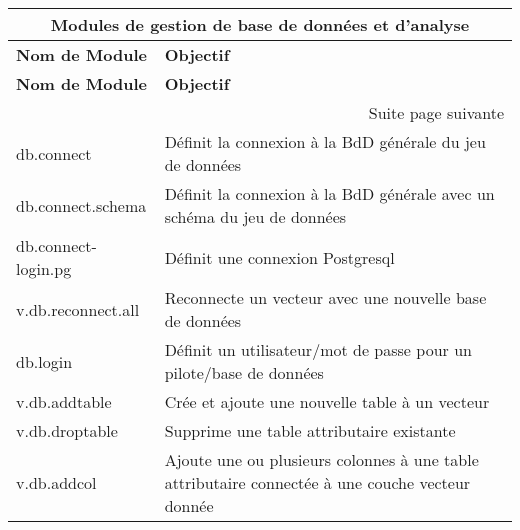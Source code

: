 \begin{center}
{\setlength{\extrarowheight}{10pt}
\small
\begin{longtable}{|p{4cm}|p{10cm}|}
\hline \multicolumn{2}{|c|}{\textbf{Modules de gestion de base de données et d'analyse}}\\
\hline \textbf{Nom de Module}&\textbf{Objectif}\\
\endfirsthead
\hline \textbf{Nom de Module}&\textbf{Objectif}\\
\endhead
\hline \multicolumn{2}{|r|}{{Suite page suivante}} \\ \hline
\endfoot
\endlastfoot
  \hline db.connect & Définit la connexion à la BdD générale du jeu de données \\
  \hline db.connect.schema & Définit la connexion à la BdD générale avec un schéma du jeu de données\\
  \hline db.connect-login.pg & Définit une connexion Postgresql \\    
  \hline v.db.reconnect.all & Reconnecte un vecteur avec une nouvelle base de données\\
  \hline db.login & Définit un utilisateur/mot de passe pour un pilote/base de données\\
  \hline v.db.addtable & Crée et ajoute une nouvelle table à un vecteur\\
  \hline v.db.droptable & Supprime une table attributaire existante \\
  \hline v.db.addcol & Ajoute une ou plusieurs colonnes à une table attributaire connectée à une couche vecteur donnée\\

\end{longtable}}
\end{center}
